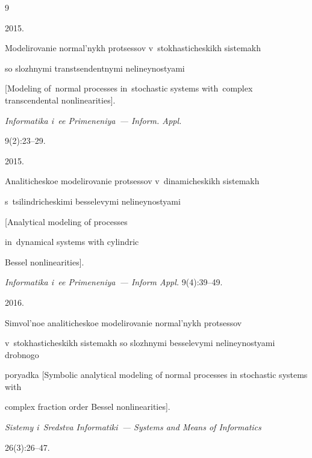 {\small\frenchspacing

{%


\begin{thebibliography}{9}


 2015.

Modelirovanie normal'nykh protsessov v~stokhasticheskikh sistemakh 

so slozhnymi transtsendentnymi ne\-li\-ney\-no\-stya\-mi

[Modeling of~normal processes in~stochastic systems with~complex transcendental  nonlinearities]. 

\textit{Informatika i~ee Primeneniya~--- Inform. Appl.} 

9(2):23--29.




 2015.

Analiticheskoe modelirovanie protsessov v~dinamicheskikh sistemakh 

s~tsilindricheskimi besselevymi nelineynostyami

[Analytical modeling of processes

in~dynamical systems with cylindric

Bessel nonlinearities].

\textit{Informatika i~ee Primeneniya~--- Inform Appl.} 9(4):39--49.




 2016.

Simvol'noe ana\-li\-ti\-che\-skoe modelirovanie normal'nykh protsessov 

v~stokhasticheskikh sistemakh so slozhnymi besselevymi nelineynostyami drobnogo 

poryadka [Symbolic analytical modeling of normal processes in stochastic systems with 

complex fraction order Bessel nonlinearities].

\textit{Sistemy i~Sredstva Informatiki~--- Systems and Means of Informatics} 

26(3):26--47.





\end{thebibliography}}}
